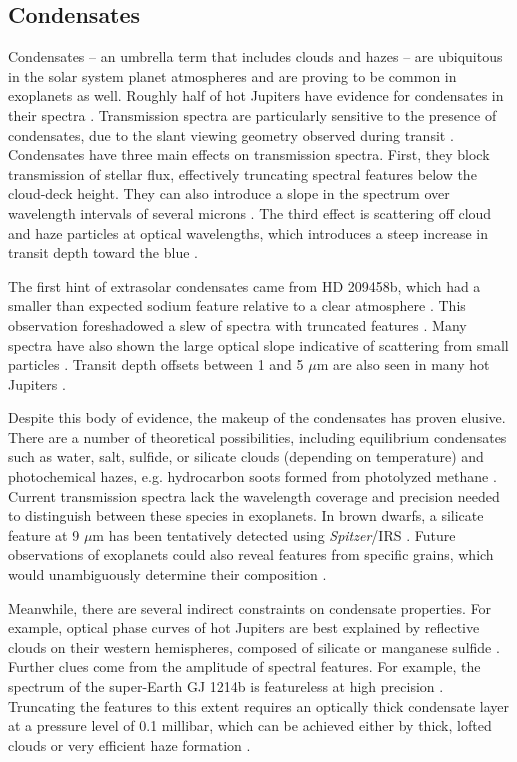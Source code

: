 \documentclass[graybox,natbib,nosecnum]{svmult}
\newcommand{\project}[1]{\textsl{#1}}
\newcommand{\Spitzer}{\project{Spitzer}}
\begin{document}
\subsection{Condensates}
Condensates -- an umbrella term that includes clouds and hazes -- are ubiquitous in the solar system planet atmospheres and are proving to be common in exoplanets as well. Roughly half of hot Jupiters have evidence for condensates in their spectra \citep{sing16}. Transmission spectra are particularly sensitive to the presence of condensates, due to the slant viewing geometry observed during transit \citep{fortney05}.  Condensates have three main effects on transmission spectra.  First, they block transmission of stellar flux, effectively truncating spectral features below the cloud-deck height.  They can also introduce a slope in the spectrum over wavelength intervals of several microns \citep[e.g][]{sing16}.  The third effect is scattering off cloud and haze particles at optical wavelengths, which introduces a steep increase in transit depth toward the blue \citep[e.g.][]{pont08}.

The first hint of extrasolar condensates came from HD 209458b, which had a smaller than expected sodium feature relative to a clear atmosphere \citep{charbonneau02}. This observation foreshadowed a slew of spectra with truncated features \citep[e.g.][]{deming13, crossfield13, kreidberg14a, knutson14a, kreidberg15b}. Many spectra have also shown the large optical slope indicative of scattering from small particles \citep[e.g][]{lecavelier08b, sing11, sing13, robinson14, dragomir15}. Transit depth offsets between 1 and 5 $\mu$m are also seen in many hot Jupiters \citep{sing16}.

Despite this body of evidence, the makeup of the condensates has proven elusive. There are a number of theoretical possibilities, including equilibrium condensates such as water, salt, sulfide, or silicate clouds (depending on temperature) and photochemical hazes, e.g. hydrocarbon soots formed from photolyzed methane \citep{burrows99, kempton12, morley13, wakeford17}. Current transmission spectra lack the wavelength coverage and precision needed to distinguish between these species in exoplanets.  In brown dwarfs, a silicate feature at 9 $\mu$m has been tentatively detected using \Spitzer/IRS \citep{cushing06}. Future observations of exoplanets could also reveal features from specific grains, which would unambiguously determine their composition \citep{wakeford15}.

Meanwhile, there are several indirect constraints on condensate properties.  For example, optical phase curves of hot Jupiters are best explained by reflective clouds on their western hemispheres, composed of silicate or manganese sulfide \citep{demory13, oreshenko16, parmentier16}. Further clues come from the amplitude of spectral features. For example, the spectrum of the super-Earth GJ 1214b is featureless at high precision \citep[30 ppm,][]{kreidberg14a}.  Truncating the features to this extent requires an optically thick condensate layer at a pressure level of 0.1 millibar, which can be achieved either by thick, lofted clouds or very efficient haze formation \citep{morley15}. 
\end{document}
